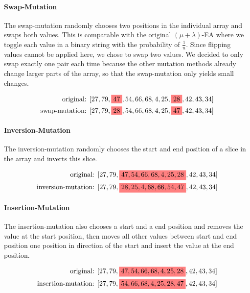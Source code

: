 \documentclass[12pt,a4paper]{article}
\newcommand{\highlight}[1]{%
  \colorbox{red!50}{$\displaystyle#1$}}
\begin{document}
\paragraph{Swap-Mutation} The swap-mutation randomly chooses two positions in the individual array and swaps both values. This is comparable with the original $(\mu + \lambda)$-EA where we toggle each value in a binary string with the probability of $\frac{1}{n}$. Since flipping values cannot be applied here, we chose to swap two values. We decided to only swap exactly one pair each time because the other mutation methods already change larger parts of the array, so that the swap-mutation only yields small changes.

\begin{align*}
    \text{original: } [27,79,\highlight{47},54,66,68,4,25,\highlight{28},42,43,34]\\ \text{swap-mutation: } [27,79,\highlight{28},54,66,68,4,25,\highlight{47},42,43,34]
\end{align*}



\paragraph{Inversion-Mutation} The inversion-mutation randomly chooses the start and end position of a slice in the array and inverts this slice.

\begin{align*}
    \text{original: } [27,79,\highlight{47,54,66,68,4,25,28},42,43,34]\\
    \text{inversion-mutation: } [27,79,\highlight{28,25,4,68,66,54,47},42,43,34]
\end{align*}



\paragraph{Insertion-Mutation} The insertion-mutation also chooses a start and a end position and removes the value at the start position, then moves all other values between start and end position one position in direction of the start and insert the value at the end position.

\begin{align*}
    \text{original: } [27,79,\highlight{47,54,66,68,4,25,28},42,43,34]\\
    \text{insertion-mutation: } [27,79,\highlight{54,66,68,4,25,28,47},42,43,34]
\end{align*}
\end{document}
